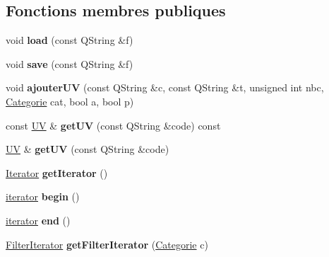 \subsection*{Fonctions membres publiques}
\begin{DoxyCompactItemize}
\item 
\hypertarget{class_u_v_manager_a60556f66f72f41786ffb70f066f1a846}{void {\bfseries load} (const Q\+String \&f)}\label{class_u_v_manager_a60556f66f72f41786ffb70f066f1a846}

\item 
\hypertarget{class_u_v_manager_a1e52ce1b69c6239d19016ec3cb74bd1c}{void {\bfseries save} (const Q\+String \&f)}\label{class_u_v_manager_a1e52ce1b69c6239d19016ec3cb74bd1c}

\item 
\hypertarget{class_u_v_manager_ae356bbc490312c58a02d2b00afee8fc3}{void {\bfseries ajouter\+U\+V} (const Q\+String \&c, const Q\+String \&t, unsigned int nbc, \hyperlink{class_categorie}{Categorie} cat, bool a, bool p)}\label{class_u_v_manager_ae356bbc490312c58a02d2b00afee8fc3}

\item 
\hypertarget{class_u_v_manager_a34b0938d1c9100068d8ecfbf56b1288e}{const \hyperlink{class_u_v}{U\+V} \& {\bfseries get\+U\+V} (const Q\+String \&code) const }\label{class_u_v_manager_a34b0938d1c9100068d8ecfbf56b1288e}

\item 
\hypertarget{class_u_v_manager_a72b706433904db6209179dc60c4d0d2e}{\hyperlink{class_u_v}{U\+V} \& {\bfseries get\+U\+V} (const Q\+String \&code)}\label{class_u_v_manager_a72b706433904db6209179dc60c4d0d2e}

\item 
\hypertarget{class_u_v_manager_a8ed63e00fc4d07be00fcbbb8b542de78}{\hyperlink{class_u_v_manager_1_1_iterator}{Iterator} {\bfseries get\+Iterator} ()}\label{class_u_v_manager_a8ed63e00fc4d07be00fcbbb8b542de78}

\item 
\hypertarget{class_u_v_manager_aecc02d7bc30df5dedc407c50236b250b}{\hyperlink{class_u_v_manager_1_1iterator}{iterator} {\bfseries begin} ()}\label{class_u_v_manager_aecc02d7bc30df5dedc407c50236b250b}

\item 
\hypertarget{class_u_v_manager_a13466f9977fb20fb018a5cd288d4b9a4}{\hyperlink{class_u_v_manager_1_1iterator}{iterator} {\bfseries end} ()}\label{class_u_v_manager_a13466f9977fb20fb018a5cd288d4b9a4}

\item 
\hypertarget{class_u_v_manager_a6c08405fd5dff4b92ccdb8ab60aca58a}{\hyperlink{class_u_v_manager_1_1_filter_iterator}{Filter\+Iterator} {\bfseries get\+Filter\+Iterator} (\hyperlink{class_categorie}{Categorie} c)}\label{class_u_v_manager_a6c08405fd5dff4b92ccdb8ab60aca58a}

\end{DoxyCompactItemize}
